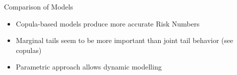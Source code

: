 {}



{Comparison of Models}
\begin{itemize}
\item<1-> Copula-based models produce more accurate Risk Numbers
\item<2-> Marginal tails seem to be more important than joint tail behavior (see copulas)
\item<3-> Parametric approach allows dynamic modelling
\end{itemize}


